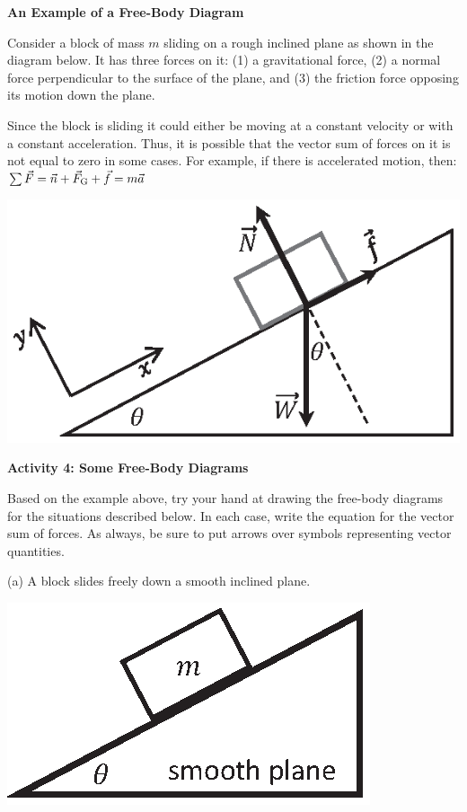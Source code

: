 \pagebreak[2]
\textbf{An Example of a Free-Body Diagram} 

Consider a block of mass $m$ sliding on a rough inclined plane as shown in the
diagram below. It has three forces on it: (1) a gravitational force, (2) a normal
force perpendicular to the surface of the plane, and (3) the friction force
opposing its motion down the plane.

Since the block is sliding it could either be moving at a constant velocity
or with a constant acceleration. Thus, it is possible that the vector sum of
forces on it is not equal to zero in some cases. For example, if there is accelerated
motion, then: \( \sum {\vec F} = {\vec n} + {\vec{F}_{\rm G}} + {\vec f}
= m{\vec a}\)

{\par\centering \includegraphics{friction/force_diagram.eps} \par}

\bigskip
\textbf{Activity 4: Some Free-Body Diagrams} 

Based on the example above, try your hand at drawing the free-body diagrams for the
situations described below. In each case, write the equation for the vector
sum of forces. As always, be sure to put arrows over symbols representing vector
quantities.

(a) A block slides freely down a smooth inclined plane.

\vspace{0.3cm}
{\par\centering \includegraphics{friction/smooth_plane.eps} \par}

